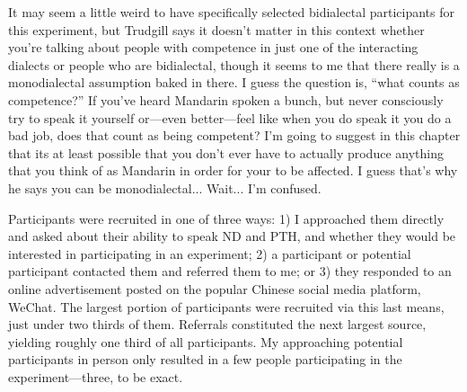     It may seem a little weird to have specifically selected bidialectal participants for this experiment, but Trudgill says it doesn't matter in this context whether you're talking about people with competence in just one of the interacting dialects or people who are bidialectal, though it seems to me that there really is a monodialectal assumption baked in there. I guess the question is, ``what counts as competence?'' If you've heard Mandarin spoken a bunch, but never consciously try to speak it yourself or---even better---feel like when you do speak it you do a bad job, does that count as being competent? I'm going to suggest in this chapter that its at least possible that you don't ever have to actually produce anything that you think of as Mandarin in order for your \ND{} to be affected. I guess that's why he says you can be monodialectal... Wait... I'm confused.


Participants were recruited in one of three ways: 1) I approached them directly and asked about their ability to speak ND and PTH, and whether they would be interested in participating in an experiment; 2) a participant or potential participant contacted them and referred them to me; or 3) they responded to an online advertisement posted on the popular Chinese social media platform, WeChat. The largest portion of participants were recruited via this last means, just under two thirds of them. Referrals constituted the next largest source, yielding roughly one third of all participants. My approaching potential participants in person only resulted in a few people participating in the experiment---three, to be exact. 
% 
% 
% 
% 

